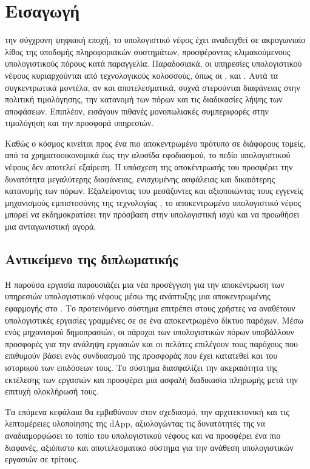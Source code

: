\chapter{Εισαγωγή} 
την σύγχρονη ψηφιακή εποχή, το υπολογιστικό νέφος 
 έχει αναδειχθεί σε ακρογωνιαίο λίθος της υποδομής
πληροφοριακών συστημάτων, προσφέροντας κλιμακούμενους υπολογιστικούς
πόρους κατά παραγγελία. Παραδοσιακά, οι υπηρεσίες υπολογιστικού νέφους 
κυριαρχούνται από τεχνολογικούς κολοσσούς, όπως οι ,  και 
. Αυτά τα συγκεντρωτικά μοντέλα, αν 
και αποτελεσματικά, συχνά στερούνται διαφάνειας στην πολιτική τιμολόγησης, 
την κατανομή των πόρων και τις διαδικασίες λήψης των αποφάσεων. 
Επιπλέον, εισάγουν πιθανές μονοπωλιακές  συμπεριφορές στην τιμολόγηση
και την προσφορά υπηρεσιών.
 
Καθώς ο κόσμος κινείται προς ένα πιο αποκεντρωμένο πρότυπο σε διάφορους 
τομείς, από τα χρηματοοικονομικά έως την αλυσίδα εφοδιασμού, το πεδίο 
υπολογιστικού νέφους δεν αποτελεί εξαίρεση. Η υπόσχεση της αποκέντρωσής 
του προσφέρει την δυνατότητα μεγαλύτερης διαφάνειας, ενισχυμένης ασφάλειας 
και δικαιότερης κατανομής των πόρων. Εξαλείφοντας του μεσάζοντες και 
αξιοποιώντας τους εγγενείς μηχανισμούς εμπιστοσύνης της τεχνολογίας 
, το αποκεντρωμένο υπολογιστικό νέφος μπορεί να εκδημοκρατίσει 
την πρόσβαση στην υπολογιστική ισχύ και να προωθήσει μια ανταγωνιστική 
αγορά.


\section{Αντικείμενο της διπλωματικής}
Η παρούσα εργασία παρουσιάζει μια νέα προσέγγιση για την αποκέντρωση 
των υπηρεσιών υπολογιστικού νέφους μέσω της ανάπτυξης μια αποκεντρωμένης 
εφαρμογής  στο . 
Το προτεινόμενο σύστημα επιτρέπει στους χρήστες να αναθέτουν υπολογιστικές 
εργασίες γραμμένες σε  σε ένα αποκεντρωμένο δίκτυο παρόχων. 
Μέσω ενός μηχανισμού δημοπρασιών, οι πάροχοι των υπολογιστικών πόρων 
υποβάλλουν προσφορές για την ανάληψη εργασιών και οι πελάτες επιλέγουν 
τους παρόχους που επιθυμούν βάσει ενός συνδυασμού της προσφοράς που έχει 
κατατεθεί και του ιστορικού των επιδόσεων τους. Το σύστημα διασφαλίζει την 
ακεραιότητα της εκτέλεσης των εργασιών και προσφέρει μια ασφαλή διαδικασία 
πληρωμής μετά την επιτυχή ολοκλήρωσή τους.

Τα επόμενα κεφάλαια θα εμβαθύνουν στον σχεδιασμό, την αρχιτεκτονική και 
τις λεπτομέρειες υλοποίησης της dApp, αξιολογώντας τις δυνατότητές της 
να αναδιαμορφώσει το τοπίο του υπολογιστικού νέφους και να προσφέρει ένα 
πιο διαφανές, αξιόπιστο και αποτελεσματικό σύστημα για την ανάθεση 
υπολογιστικών εργασιών σε τρίτους.



